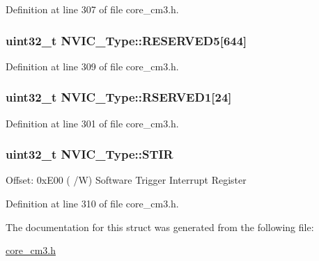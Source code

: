 Definition at line 307 of file core\+\_\+cm3.\+h.

\subsubsection[{\texorpdfstring{R\+E\+S\+E\+R\+V\+E\+D5}{RESERVED5}}]{\setlength{\rightskip}{0pt plus 5cm}uint32\+\_\+t N\+V\+I\+C\+\_\+\+Type\+::\+R\+E\+S\+E\+R\+V\+E\+D5\mbox{[}644\mbox{]}}\hypertarget{structNVIC__Type_a4f753b4f824270175af045ac99bc12e8}{}\label{structNVIC__Type_a4f753b4f824270175af045ac99bc12e8}


Definition at line 309 of file core\+\_\+cm3.\+h.

\subsubsection[{\texorpdfstring{R\+S\+E\+R\+V\+E\+D1}{RSERVED1}}]{\setlength{\rightskip}{0pt plus 5cm}uint32\+\_\+t N\+V\+I\+C\+\_\+\+Type\+::\+R\+S\+E\+R\+V\+E\+D1\mbox{[}24\mbox{]}}\hypertarget{structNVIC__Type_a6d1daf7ab6f2ba83f57ff67ae6f571fe}{}\label{structNVIC__Type_a6d1daf7ab6f2ba83f57ff67ae6f571fe}


Definition at line 301 of file core\+\_\+cm3.\+h.

\subsubsection[{\texorpdfstring{S\+T\+IR}{STIR}}]{ uint32\+\_\+t N\+V\+I\+C\+\_\+\+Type\+::\+S\+T\+IR}\hypertarget{structNVIC__Type_a0b0d7f3131da89c659a2580249432749}{}\label{structNVIC__Type_a0b0d7f3131da89c659a2580249432749}
Offset\+: 0x\+E00 ( /W) Software Trigger Interrupt Register 

Definition at line 310 of file core\+\_\+cm3.\+h.



The documentation for this struct was generated from the following file\+:\begin{DoxyCompactItemize}
\item 
\hyperlink{core__cm3_8h}{core\+\_\+cm3.\+h}\end{DoxyCompactItemize}
